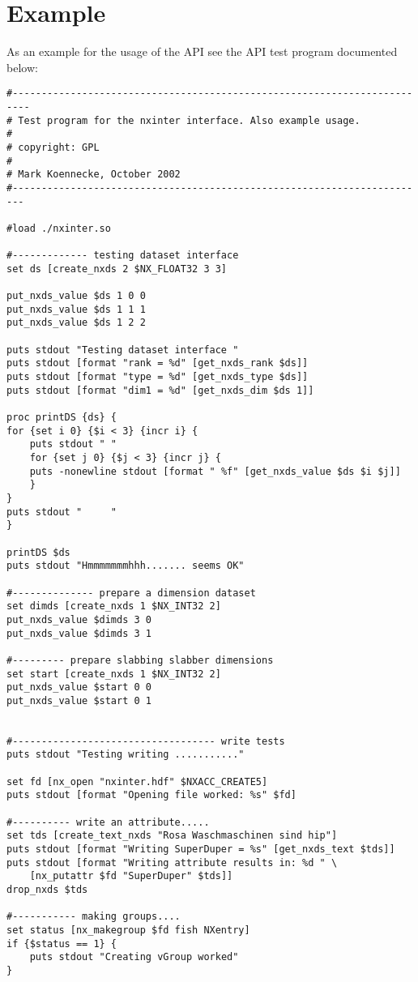 \documentclass[12pt,a4paper]{article}
\begin{document}
\section{Example}
As an example for the usage of the API see the API test program
documented below:
\begin{verbatim}
#-------------------------------------------------------------------------
# Test program for the nxinter interface. Also example usage.
#
# copyright: GPL
#
# Mark Koennecke, October 2002
#------------------------------------------------------------------------

#load ./nxinter.so

#------------- testing dataset interface
set ds [create_nxds 2 $NX_FLOAT32 3 3]

put_nxds_value $ds 1 0 0
put_nxds_value $ds 1 1 1
put_nxds_value $ds 1 2 2

puts stdout "Testing dataset interface "
puts stdout [format "rank = %d" [get_nxds_rank $ds]]
puts stdout [format "type = %d" [get_nxds_type $ds]]
puts stdout [format "dim1 = %d" [get_nxds_dim $ds 1]]

proc printDS {ds} {
for {set i 0} {$i < 3} {incr i} {
    puts stdout " "
    for {set j 0} {$j < 3} {incr j} {
	puts -nonewline stdout [format " %f" [get_nxds_value $ds $i $j]]
    }
}
puts stdout "     "
}

printDS $ds
puts stdout "Hmmmmmmmhhh....... seems OK"

#-------------- prepare a dimension dataset  
set dimds [create_nxds 1 $NX_INT32 2]
put_nxds_value $dimds 3 0
put_nxds_value $dimds 3 1

#--------- prepare slabbing slabber dimensions
set start [create_nxds 1 $NX_INT32 2]
put_nxds_value $start 0 0
put_nxds_value $start 0 1


#----------------------------------- write tests
puts stdout "Testing writing ..........."

set fd [nx_open "nxinter.hdf" $NXACC_CREATE5]
puts stdout [format "Opening file worked: %s" $fd]

#---------- write an attribute.....
set tds [create_text_nxds "Rosa Waschmaschinen sind hip"]
puts stdout [format "Writing SuperDuper = %s" [get_nxds_text $tds]]
puts stdout [format "Writing attribute results in: %d " \
	[nx_putattr $fd "SuperDuper" $tds]]
drop_nxds $tds

#----------- making groups....
set status [nx_makegroup $fd fish NXentry]
if {$status == 1} {
    puts stdout "Creating vGroup worked"
}


\end{verbatim}
\end{document}
